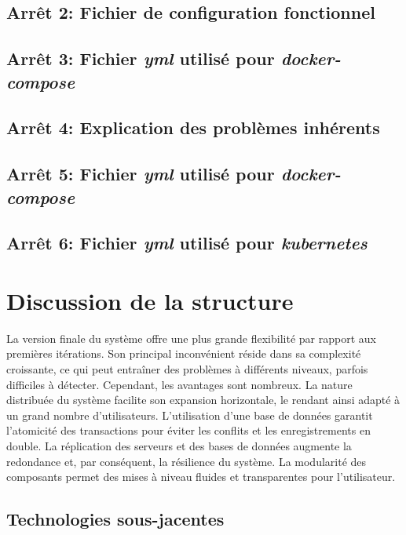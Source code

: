 \documentclass[a11paper, 11pt]{article}
\begin{document}
\subsection{Arrêt 2: Fichier de configuration fonctionnel}


\newpage
\subsection{Arrêt 3: Fichier \textit{yml} utilisé pour \textit{docker-compose}}


\subsection{Arrêt 4: Explication des problèmes inhérents}

\subsection{Arrêt 5: Fichier \textit{yml} utilisé pour \textit{docker-compose}}

\subsection{Arrêt 6: Fichier \textit{yml} utilisé pour \textit{kubernetes}}

\section{Discussion de la structure}

La version finale du système offre une plus grande flexibilité par rapport aux premières itérations. Son principal inconvénient réside dans sa complexité croissante, ce qui peut entraîner des problèmes à différents niveaux, parfois difficiles à détecter. Cependant, les avantages sont nombreux. La nature distribuée du système facilite son expansion horizontale, le rendant ainsi adapté à un grand nombre d'utilisateurs. L'utilisation d'une base de données garantit l'atomicité des transactions pour éviter les conflits et les enregistrements en double. La réplication des serveurs et des bases de données augmente la redondance et, par conséquent, la résilience du système. La modularité des composants permet des mises à niveau fluides et transparentes pour l'utilisateur.

\subsection{Technologies sous-jacentes}
\end{document}
